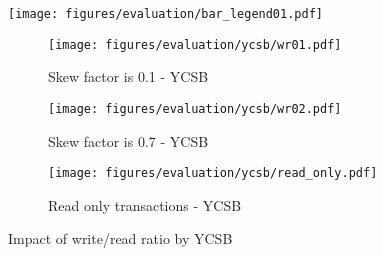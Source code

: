 
\begin{figure}[]
    \centering
    \begin{minipage}{0.8\linewidth}
        \centering
        \texttt{[image: figures/evaluation/bar\_legend01.pdf]}
        \vspace{-5mm}
    \end{minipage}
    \begin{minipage}{0.95\linewidth}
        \centering
        \begin{subfigure}{0.48\linewidth}
            \texttt{[image: figures/evaluation/ycsb/wr01.pdf]}
            \vspace{-6mm}
            \caption{Skew factor is 0.1 - YCSB}
            \label{fig:ycsb.wr.skew01}
        \end{subfigure}
        \begin{subfigure}{0.48\linewidth}
            \texttt{[image: figures/evaluation/ycsb/wr02.pdf]}
            \vspace{-6mm}
            \caption{Skew factor is 0.7 - YCSB}
            \label{fig:ycsb.wr.skew07}
        \end{subfigure}
        \begin{subfigure}{0.9\linewidth}
            \vspace{1mm}   
            \texttt{[image: figures/evaluation/ycsb/read\_only.pdf]}
            \vspace{-6mm}
            \caption{Read only transactions - YCSB}
            \label{fig:ycsb.wr.ro}
        \end{subfigure}
    \end{minipage}
    \vspace{-4mm}
    \caption{Impact of write/read ratio by YCSB}
    \label{fig:evaluation.wr}
    \vspace{-4mm}
\end{figure}


